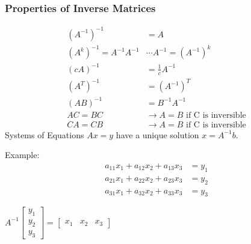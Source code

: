 \documentclass[]{article}
\begin{document}
\subsubsection{Properties of Inverse Matrices}
	\begin{align}
		( A^{−1} )^{−1} &= A  \\
		( A^k )^{−1} = A^{−1} A^{−1}  &\cdots A^{−1}  = ( A^{−1})^k \\
		( cA )^{−1} &= \frac{1}{c}A^{−1} \\
		( A^T )^{−1} &= ( A^{−1} )^T \\
		(AB)^{−1} &= B^{−1}A^{−1} \\
		AC = BC &\rightarrow A = B \text{  if C is inversible} \\
		CA = CB &\rightarrow A = B \text{  if C is inversible} 
	\end{align}
Systems of Equations 
$Ax = y$ 
have a unique solution 
$x = A^{-1}b$.
	\begin{framed}
		Example: \\
		\begin{align*}
			a_{11}x_1 + a_{12}x_2 + a_{13}x_3 &= y_1 \\
			a_{21}x_1 + a_{22}x_2 + a_{23}x_3 &= y_2 \\
			a_{31}x_1 + a_{32}x_2 + a_{33}x_3 &= y_3
		\end{align*}
		\begin{center}
		$ 
			A^{-1} 
			\begin{bmatrix} y_1 \\ y_2 \\ y_3 \end{bmatrix} = 
			\begin{bmatrix} x_1 & x_2 & x_3 \end{bmatrix} 
		$
		\end{center}
	\end{framed}	
	
\end{document}
